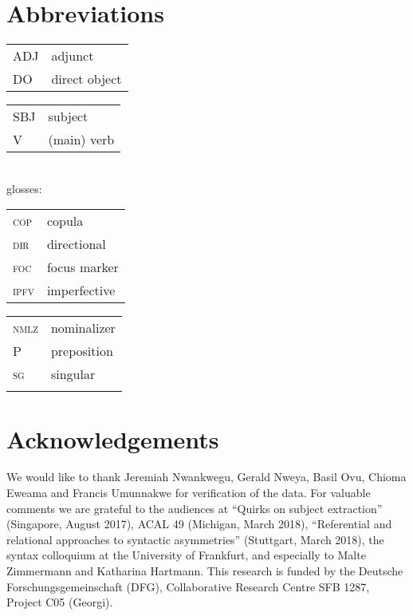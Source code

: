 \documentclass[output=paper,colorlinks,citecolor=brown]{langscibook}
\begin{document}
\section*{Abbreviations}
\begin{tabularx}{.45\textwidth}{lQ}
ADJ  &  adjunct\\
 DO  &  direct object\\
 \end{tabularx}
 \begin{tabularx}{.45\textwidth}{lQ}
 SBJ  &  subject\\
 V  &  (main) verb\\
 \end{tabularx}
\medskip\\
 glosses:
\medskip\\
 \begin{tabularx}{.45\textwidth}{lQ}
  \textsc{cop}  &  copula\\
 \textsc{dir}  &  directional\\
 \textsc{foc}  &  focus marker\\
 \textsc{ipfv}  &  imperfective\\
 \end{tabularx}
 \begin{tabularx}{.45\textwidth}{lQ}
 \textsc{nmlz}  &  nominalizer\\
 P  &  preposition\\
  \textsc{sg}  &  singular\\
  \\
\end{tabularx}


\section*{Acknowledgements}
We would like to thank Jeremiah Nwankwegu, Gerald Nweya, Basil Ovu, Chioma Eweama and Francis Umunnakwe for verification of the  data. For valuable comments we are grateful to the audiences at ``Quirks on subject extraction'' (Singapore, August 2017), ACAL 49 (Michigan, March 2018), ``Referential and relational approaches to syntactic asymmetries'' (Stuttgart, March 2018), the syntax colloquium at the University of Frankfurt, and especially to Malte Zimmermann and Katharina Hartmann. This research is funded by the Deutsche Forschungsgemeinschaft (DFG), Collaborative Research Centre SFB 1287, Project C05 (Georgi).

\sloppy
 \printbibliography[heading=subbibliography,notkeyword=this]
\end{document}
